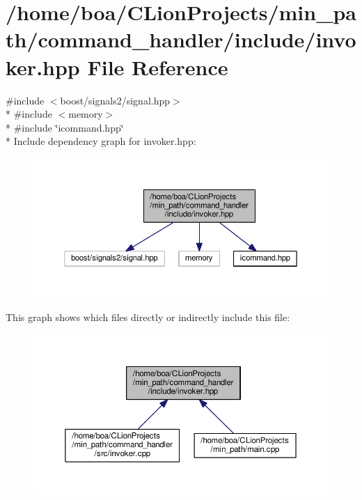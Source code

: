 \hypertarget{a00022}{}\section{/home/boa/\+C\+Lion\+Projects/min\+\_\+path/command\+\_\+handler/include/invoker.hpp File Reference}
\label{a00022}
{\ttfamily \#include $<$boost/signals2/signal.\+hpp$>$}\\*
{\ttfamily \#include $<$memory$>$}\\*
{\ttfamily \#include \char`\"{}icommand.\+hpp\char`\"{}}\\*
Include dependency graph for invoker.\+hpp\+:
\nopagebreak
\begin{figure}[H]
\begin{center}
\leavevmode
\includegraphics[width=350pt]{d2/d79/a00051}
\end{center}
\end{figure}
This graph shows which files directly or indirectly include this file\+:
\nopagebreak
\begin{figure}[H]
\begin{center}
\leavevmode
\includegraphics[width=350pt]{d1/d84/a00052}
\end{center}
\end{figure}
